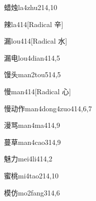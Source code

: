 \begin{verbete}{蜡烛}{la4zhu2}{14,10}
\end{verbete}

\begin{verbete}{辣}{la4}{14}[Radical 辛]
\end{verbete}

\begin{verbete}{漏}{lou4}{14}[Radical 水]
\end{verbete}

\begin{verbete}{漏电}{lou4dian4}{14,5}
\end{verbete}

\begin{verbete}{馒头}{man2tou5}{14,5}
\end{verbete}

\begin{verbete}{慢}{man4}{14}[Radical 心]
\end{verbete}

\begin{verbete}{慢动作}{man4dong4zuo4}{14,6,7}
\end{verbete}

\begin{verbete}{漫骂}{man4ma4}{14,9}
\end{verbete}

\begin{verbete}{蔓草}{man4cao3}{14,9}
\end{verbete}

\begin{verbete}{魅力}{mei4li4}{14,2}
\end{verbete}

\begin{verbete}{蜜桃}{mi4tao2}{14,10}
\end{verbete}

\begin{verbete}{模仿}{mo2fang3}{14,6}
\end{verbete}

